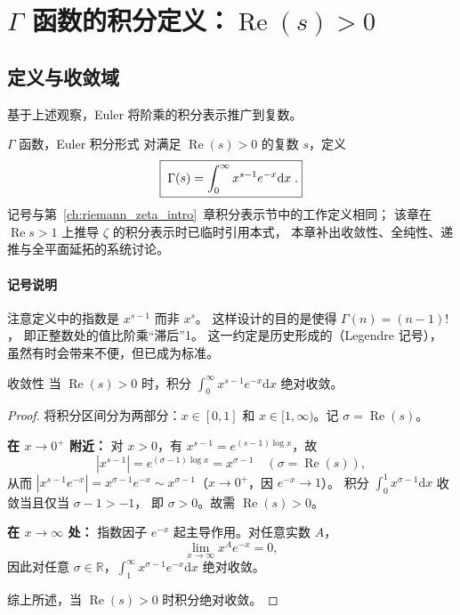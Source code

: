 \section{\texorpdfstring{$\Gamma$}{Gamma} 函数的积分定义：\texorpdfstring{$\operatorname{Re}(s) > 0$}{Re(s)>0}}\label{sec:gamma_def}

\subsection{定义与收敛域}

基于上述观察，Euler 将阶乘的积分表示推广到复数。

\begin{definition}{$\Gamma$ 函数，Euler 积分形式}{}\label{def:gamma}
对满足 $\operatorname{Re}(s) > 0$ 的复数 $s$，定义
\begin{equation}
    \boxed{\;
    \Gamma(s) = \int_0^\infty x^{s-1} e^{-x} \mathrm{d} x
    \;\vphantom{\int_0^\infty}.
    }
    \label{eq:gamma-def}
\end{equation}
记号与第~\ref{ch:riemann_zeta_intro}~章积分表示节中的工作定义相同；
该章在 $\operatorname{Re}s>1$ 上推导 $\zeta$ 的积分表示时已临时引用本式，
本章补出收敛性、全纯性、递推与全平面延拓的系统讨论。
\end{definition}


\paragraph{记号说明}
注意定义中的指数是 $x^{s-1}$ 而非 $x^s$。
这样设计的目的是使得 $\Gamma(n) = (n-1)!$，
即正整数处的值比阶乘“滞后”1。
这一约定是历史形成的（Legendre 记号），
虽然有时会带来不便，但已成为标准。


\begin{theorem}{收敛性}{}\label{thm:gamma-convergence}
当 $\operatorname{Re}(s) > 0$ 时，积分 $\int_0^\infty x^{s-1} e^{-x}\mathrm{d} x$ 绝对收敛。
\end{theorem}

\begin{proof}
将积分区间分为两部分：$x \in [0,1]$ 和 $x \in [1, \infty)$。记 $\sigma = \operatorname{Re}(s)$。

\noindent\textbf{在 $x \to 0^+$ 附近：}
对 $x > 0$，有 $x^{s-1} = e^{(s-1)\log x}$，故
\[
|x^{s-1}| = e^{(\sigma-1)\log x} = x^{\sigma-1} \quad (\sigma = \operatorname{Re}(s)),
\]
从而 $|x^{s-1} e^{-x}| = x^{\sigma-1} e^{-x} \sim x^{\sigma-1}$（$x \to 0^+$，因 $e^{-x} \to 1$）。
积分 $\int_0^1 x^{\sigma-1}\mathrm{d} x$ 收敛当且仅当 $\sigma-1 > -1$，
即 $\sigma > 0$。故需 $\operatorname{Re}(s) > 0$。

\noindent\textbf{在 $x \to \infty$ 处：}
指数因子 $e^{-x}$ 起主导作用。对任意实数 $A$，
\[
\lim_{x \to \infty} x^{A} e^{-x} = 0,
\]
因此对任意 $\sigma\in\mathbb{R}$，$\int_1^\infty x^{\sigma-1} e^{-x}\mathrm{d} x$ 绝对收敛。

综上所述，当 $\operatorname{Re}(s) > 0$ 时积分绝对收敛。
\end{proof}

